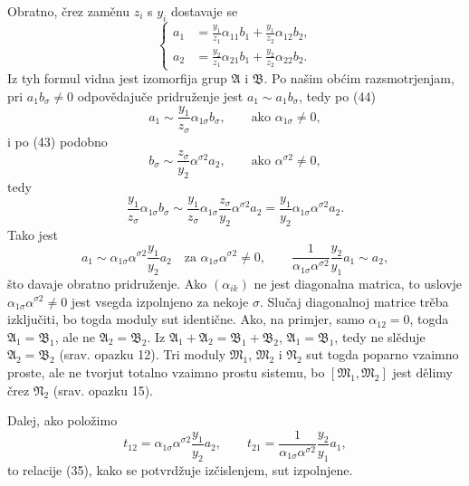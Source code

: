 \documentclass[11pt]{article}
\begin{document}
Obratno, črez zaměnu \(z_i\) s \(y_i\) dostavaje se
\begin{equation}
\left\{
\begin{aligned}
 a_1&=\frac{y_1}{z_1}\alpha_{11}b_1+\frac{y_1}{z_2}\alpha_{12}b_2,\\
 a_2&=\frac{y_2}{z_1}\alpha_{21}b_1+\frac{y_2}{z_2}\alpha_{22}b_2.
\end{aligned}\right.
\tag{44}
\end{equation}
Iz tyh formul vidna jest izomorfija grup \(\mathfrak A\) i \(\mathfrak B\). Po našim obćim razsmotrjenjam, pri \(a_1b_\sigma\ne0\) odpovědajuče pridruženje jest \(a_1\sim a_1b_\sigma\), tedy po (44)
\[
 a_1\sim\frac{y_1}{z_\sigma}\alpha_{1\sigma}b_\sigma,
 \qquad\text{ako }\alpha_{1\sigma}\ne0,
\]
i po (43) podobno
\[
 b_\sigma\sim\frac{z_\sigma}{y_2}\alpha^{\sigma2}a_2,
 \qquad\text{ako }\alpha^{\sigma2}\ne0,
\]
tedy
\[
 \frac{y_1}{z_\sigma}\alpha_{1\sigma}b_\sigma
 \sim
 \frac{y_1}{z_\sigma}\alpha_{1\sigma}\frac{z_\sigma}{y_2}\alpha^{\sigma2}a_2
 =\frac{y_1}{y_2}\alpha_{1\sigma}\alpha^{\sigma2}a_2.
\]
Tako jest
\[
 a_1\sim\alpha_{1\sigma}\alpha^{\sigma2}\frac{y_1}{y_2}a_2
 \quad\text{za }\alpha_{1\sigma}\alpha^{\sigma2}\ne0,
 \qquad
 \frac{1}{\alpha_{1\sigma}\alpha^{\sigma2}}\frac{y_2}{y_1}a_1\sim a_2,
\]
što davaje obratno pridruženje. Ako \((\alpha_{ik})\) ne jest diagonalna matrica, to uslovje \(\alpha_{1\sigma}\alpha^{\sigma2}\ne0\) jest vsegda izpolnjeno za nekoje \(\sigma\). Slučaj diagonalnoj matrice trěba izključiti, bo togda moduly sut identične. Ako, na primjer, samo \(\alpha_{12}=0\), togda \(\mathfrak A_1=\mathfrak B_1\), ale ne \(\mathfrak A_2=\mathfrak B_2\). Iz \(\mathfrak A_1+\mathfrak A_2=\mathfrak B_1+\mathfrak B_2\), \(\mathfrak A_1=\mathfrak B_1\), tedy ne slěduje \(\mathfrak A_2=\mathfrak B_2\) (srav. opazku 12). Tri moduly \(\mathfrak M_1\), \(\mathfrak M_2\) i \(\mathfrak N_2\) sut togda poparno vzaimno proste, ale ne tvorjut totalno vzaimno prostu sistemu, bo \([\mathfrak M_1,
\mathfrak M_2]\) jest dělimy črez \(\mathfrak N_2\) (srav. opazku 15).

Dalej, ako položimo
\[
 t_{12}=\alpha_{1\sigma}\alpha^{\sigma2}\frac{y_1}{y_2}a_2,
 \qquad
 t_{21}=\frac{1}{\alpha_{1\sigma}\alpha^{\sigma2}}\frac{y_2}{y_1}a_1,
\]
to relacije (35), kako se potvrdžuje izčislenjem, sut izpolnjene.
\end{document}
